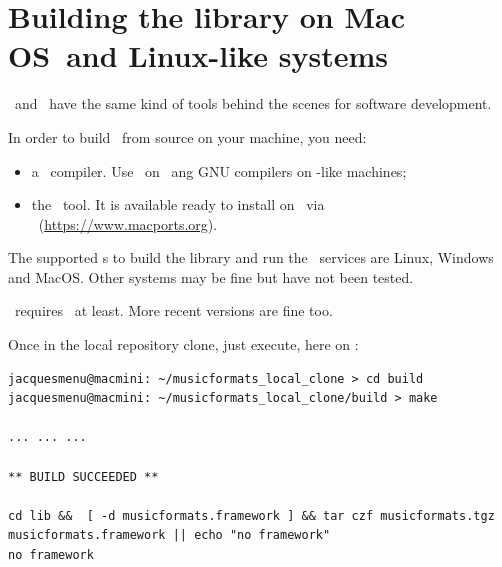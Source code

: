 \section{Building the library on Mac OS\texttrademark\ and Linux-like systems}

\MacOS\ and \Linux\ have the same kind of tools behind the scenes for software development.

In order to build \mf\ from source on your machine, you need:
\begin{itemize}
\item a \CPlusplus\ compiler. Use \xcode\ on \MacOS\ ang GNU compilers on \Unix -like machines;
\item the \cmake\ tool. It is available ready to install on \MacOS\ via \macports\ (\url{https://www.macports.org}).
\end{itemize}

The supported \OS s to build the library and run the \CLI\ services are Linux, Windows and MacOS. Other systems may be fine but have not been tested.

\mf\ requires \CPlusplus\ at least. More recent versions are fine too.

Once in the local repository clone, just execute, here on \MacOS:
\begin{lstlisting}[language=Terminal]
jacquesmenu@macmini: ~/musicformats_local_clone > cd build
jacquesmenu@macmini: ~/musicformats_local_clone/build > make

... ... ...

** BUILD SUCCEEDED **

cd lib &&  [ -d musicformats.framework ] && tar czf musicformats.tgz musicformats.framework || echo "no framework"
no framework
\end{lstlisting}


